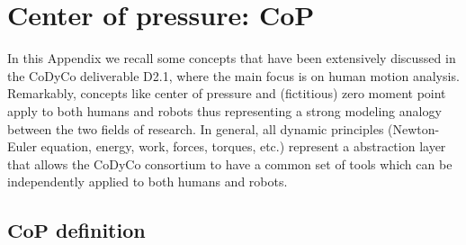 \documentclass[12pt,a4paper,twoside]{article}
\begin{document}



\newpage \appendix

\section{Center of pressure: $\bm {CoP}$}

In this Appendix we recall some concepts that have been extensively discussed in the CoDyCo deliverable D2.1, where the main focus is on human motion analysis. Remarkably, concepts like center of pressure and (fictitious) zero moment point apply to both humans and robots thus representing a strong modeling analogy between the two fields of research. In general, all dynamic principles (Newton-Euler equation, energy, work, forces, torques, etc.) represent a abstraction layer that allows the CoDyCo consortium to have a common set of tools which can be independently applied to both humans and robots. 

\subsection{$\bm{CoP}$ definition}
\end{document}
